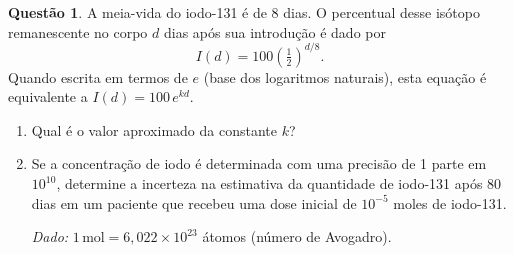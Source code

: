 \documentclass[12pt,a4paper]{article}
\theoremstyle{definition}
\newtheorem{questao}{Quest\~ao}
\begin{document}
\begin{questao}
A meia-vida do iodo-131 \'e de 8 dias. O percentual desse isótopo remanescente no corpo $d$ dias ap\'os sua introdu\c{c}\~ao \'e dado por
\[
  I(d) = 100\!\left(\tfrac{1}{2}\right)^{d/8}.
\]
Quando escrita em termos de $e$ (base dos logaritmos naturais), esta equa\c{c}\~ao \'e equivalente a $I(d) = 100\,e^{kd}$.
\begin{enumerate}[label=\textbf{\alph*)}]
  \item Qual \'e o valor aproximado da constante $k$?
  \item Se a concentra\c{c}\~ao de iodo \'e determinada com uma precis\~ao de 1 parte em $10^{10}$, determine a incerteza na estimativa da quantidade de iodo-131 ap\'os 80 dias em um paciente que recebeu uma dose inicial de $10^{-5}$ moles de iodo-131.
  \par\textit{Dado:} $1\,\text{mol} = 6{,}022\times 10^{23}$ \'atomos (n\'umero de Avogadro).
\end{enumerate}
\end{questao}
\end{document}
